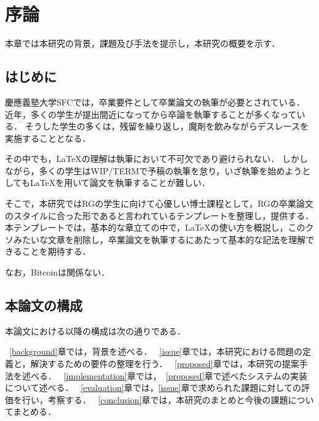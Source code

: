 \chapter{序論}
\label{introduction}

本章では本研究の背景，課題及び手法を提示し，本研究の概要を示す．

\section{はじめに}
\label{introduction:background}
慶應義塾大学SFCでは，卒業要件として卒業論文の執筆が必要とされている．
近年，多くの学生が提出間近になってから卒論を執筆することが多くなっている．
そうした学生の多くは，残留を繰り返し，魔剤を飲みながらデスレースを実施することとなる．

その中でも，\LaTeX の理解は執筆において不可欠であり避けられない．
しかしながら，多くの学生はWIP/TERMで予稿の執筆を怠り，いざ執筆を始めようとしても\LaTeX を用いて論文を執筆することが難しい．

そこで，本研究ではRGの学生に向けて心優しい博士課程として，RGの卒業論文のスタイルに合った形であると言われているテンプレートを整理し，提供する．
本テンプレートでは，基本的な章立ての中で，\LaTeX の使い方を概説し，このクソみたいな文章を削除し，卒業論文を執筆するにあたって基本的な記法を理解できることを期待する．

なお，Bitcoinは関係ない．

\section{本論文の構成}

本論文における以降の構成は次の通りである．

~\ref{background}章では，背景を述べる．
~\ref{issue}章では，本研究における問題の定義と，解決するための要件の整理を行う．
~\ref{proposed}章では，本研究の提案手法を述べる．
~\ref{implementation}章では，~\ref{proposed}章で述べたシステムの実装について述べる．
~\ref{evaluation}章では，\ref{issue}章で求められた課題に対しての評価を行い，考察する．
~\ref{conclusion}章では，本研究のまとめと今後の課題についてまとめる．


